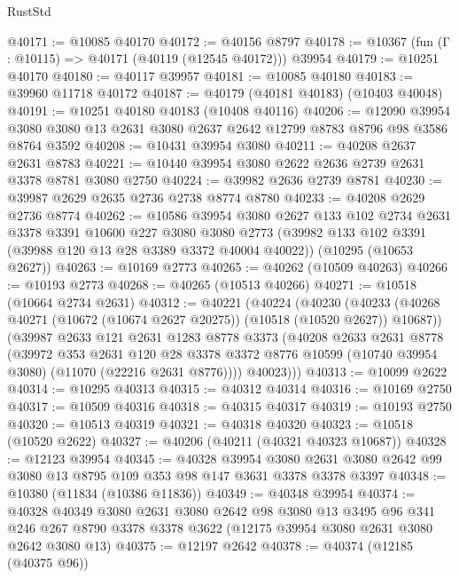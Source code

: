 \begin{lexlean}{RustStd}
\begin{coremodule}
@40171 := @10085 @40170
@40172 := @40156 @8797
@40178 := @10367 (fun (Γ : @10115) => @40171 (@40119 (@12545 @40172))) @39954
@40179 := @10251 @40170
@40180 := @40117 @39957
@40181 := @10085 @40180
@40183 := @39960 @11718 @40172
@40187 := @40179 (@40181 @40183) (@10403 @40048)
@40191 := @10251 @40180 @40183 (@10408 @40116)
@40206 := @12090
    @39954
    @3080
    @3080
    @13
    @2631
    @3080
    @2637
    @2642
    @12799
    @8783
    @8796
    @98
    @3586
    @8764
    @3592
@40208 := @10431 @39954 @3080
@40211 := @40208 @2637 @2631 @8783
@40221 := @10440 @39954 @3080 @2622 @2636 @2739 @2631 @3378 @8781 @3080 @2750
@40224 := @39982 @2636 @2739 @8781
@40230 := @39987 @2629 @2635 @2736 @2738 @8774 @8780
@40233 := @40208 @2629 @2736 @8774
@40262 := @10586
    @39954
    @3080
    @2627
    @133
    @102
    @2734
    @2631
    @3378
    @3391
    @10600
    @227
    @3080
    @3080
    @2773
    (@39982 @133 @102 @3391 (@39988 @120 @13 @28 @3389 @3372 @40004 @40022))
    (@10295 (@10653 @2627))
@40263 := @10169 @2773
@40265 := @40262 (@10509 @40263)
@40266 := @10193 @2773
@40268 := @40265 (@10513 @40266)
@40271 := @10518 (@10664 @2734 @2631)
@40312 := @40221
    (@40224
      (@40230
        (@40233 (@40268 @40271 (@10672 (@10674 @2627 @20275)) (@10518 (@10520 @2627)) @10687))
        (@39987
          @2633
          @121
          @2631
          @1283
          @8778
          @3373
          (@40208
            @2633
            @2631
            @8778
            (@39972
              @353
              @2631
              @120
              @28
              @3378
              @3372
              @8776
              @10599
              (@10740 @39954 @3080)
              (@11070 (@22216 @2631 @8776))))
          @40023)))
@40313 := @10099 @2622
@40314 := @10295 @40313
@40315 := @40312 @40314
@40316 := @10169 @2750
@40317 := @10509 @40316
@40318 := @40315 @40317
@40319 := @10193 @2750
@40320 := @10513 @40319
@40321 := @40318 @40320
@40323 := @10518 (@10520 @2622)
@40327 := @40206 (@40211 (@40321 @40323 @10687))
@40328 := @12123 @39954
@40345 := @40328
    @39954
    @3080
    @2631
    @3080
    @2642
    @99
    @3080
    @13
    @8795
    @109
    @353
    @98
    @147
    @3631
    @3378
    @3378
    @3397
@40348 := @10380 (@11834 (@10386 @11836))
@40349 := @40348 @39954
@40374 := @40328
    @40349
    @3080
    @2631
    @3080
    @2642
    @98
    @3080
    @13
    @3495
    @96
    @341
    @246
    @267
    @8790
    @3378
    @3378
    @3622
    (@12175 @39954 @3080 @2631 @3080 @2642 @3080 @13)
@40375 := @12197 @2642
@40378 := @40374 (@12185 (@40375 @96))

\end{coremodule}
\end{lexlean}
